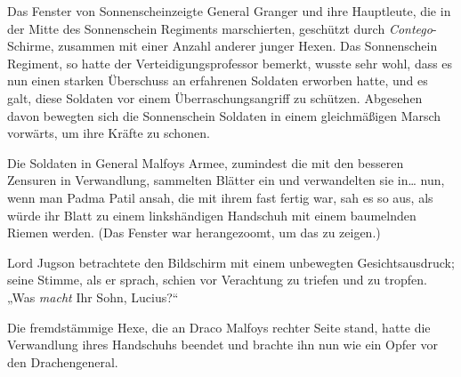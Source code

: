 Das Fenster von Sonnenscheinzeigte General Granger und ihre Hauptleute, die in der Mitte des Sonnenschein Regiments marschierten, geschützt durch \emph{Contego}-Schirme, zusammen mit einer Anzahl anderer junger Hexen. Das Sonnenschein Regiment, so hatte der Verteidigungsprofessor bemerkt, wusste sehr wohl, dass es nun einen starken Überschuss an erfahrenen Soldaten erworben hatte, und es galt, diese Soldaten vor einem Überraschungsangriff zu schützen. Abgesehen davon bewegten sich die Sonnenschein Soldaten in einem gleichmäßigen Marsch vorwärts, um ihre Kräfte zu schonen.

Die Soldaten in General Malfoys Armee, zumindest die mit den besseren Zensuren in Verwandlung, sammelten Blätter ein und verwandelten sie in… nun, wenn man Padma Patil ansah, die mit ihrem fast fertig war, sah es so aus, als würde ihr Blatt zu einem linkshändigen Handschuh mit einem baumelnden Riemen werden. (Das Fenster war herangezoomt, um das zu zeigen.)

Lord Jugson betrachtete den Bildschirm mit einem unbewegten Gesichtsausdruck; seine Stimme, als er sprach, schien vor Verachtung zu triefen und zu tropfen. „Was \emph{macht} Ihr Sohn, Lucius?“

Die fremdstämmige Hexe, die an Draco Malfoys rechter Seite stand, hatte die Verwandlung ihres Handschuhs beendet und brachte ihn nun wie ein Opfer vor den Drachengeneral.

